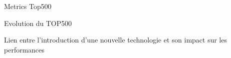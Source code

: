 %
\begin{Frame}{Metrics Top500}
  \begin{block}{Evolution du TOP500}

    Lien entre l'introduction d'une nouvelle technologie et son impact
    sur les performances
  \end{block}   
\end{Frame}


